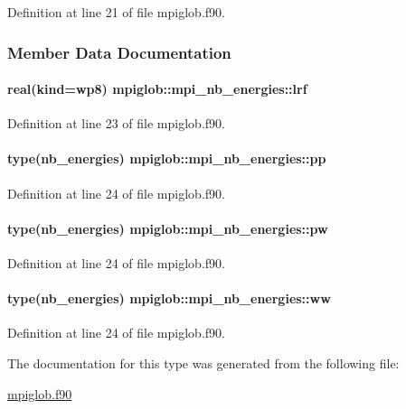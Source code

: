 Definition at line 21 of file mpiglob.\-f90.



\subsubsection{Member Data Documentation}
\hypertarget{structmpiglob_1_1mpi__nb__energies_a19fe251f3a5deebca01f830ae65c6f82}{
\paragraph[{lrf}]{\setlength{\rightskip}{0pt plus 5cm}real(kind=wp8) mpiglob\-::mpi\-\_\-nb\-\_\-energies\-::lrf}}\label{structmpiglob_1_1mpi__nb__energies_a19fe251f3a5deebca01f830ae65c6f82}


Definition at line 23 of file mpiglob.\-f90.

\hypertarget{structmpiglob_1_1mpi__nb__energies_a73129e8f9a9f28ee2faeb1a0f41daf61}{
\paragraph[{pp}]{\setlength{\rightskip}{0pt plus 5cm}type(nb\-\_\-energies) mpiglob\-::mpi\-\_\-nb\-\_\-energies\-::pp}}\label{structmpiglob_1_1mpi__nb__energies_a73129e8f9a9f28ee2faeb1a0f41daf61}


Definition at line 24 of file mpiglob.\-f90.

\hypertarget{structmpiglob_1_1mpi__nb__energies_ac275b878005f8f193e0b963b6a934178}{
\paragraph[{pw}]{\setlength{\rightskip}{0pt plus 5cm}type(nb\-\_\-energies) mpiglob\-::mpi\-\_\-nb\-\_\-energies\-::pw}}\label{structmpiglob_1_1mpi__nb__energies_ac275b878005f8f193e0b963b6a934178}


Definition at line 24 of file mpiglob.\-f90.

\hypertarget{structmpiglob_1_1mpi__nb__energies_a263a5bec3e70a89b0b17e7499e509554}{
\paragraph[{ww}]{\setlength{\rightskip}{0pt plus 5cm}type(nb\-\_\-energies) mpiglob\-::mpi\-\_\-nb\-\_\-energies\-::ww}}\label{structmpiglob_1_1mpi__nb__energies_a263a5bec3e70a89b0b17e7499e509554}


Definition at line 24 of file mpiglob.\-f90.



The documentation for this type was generated from the following file\-:\begin{DoxyCompactItemize}
\item 
\hyperlink{mpiglob_8f90}{mpiglob.\-f90}\end{DoxyCompactItemize}
